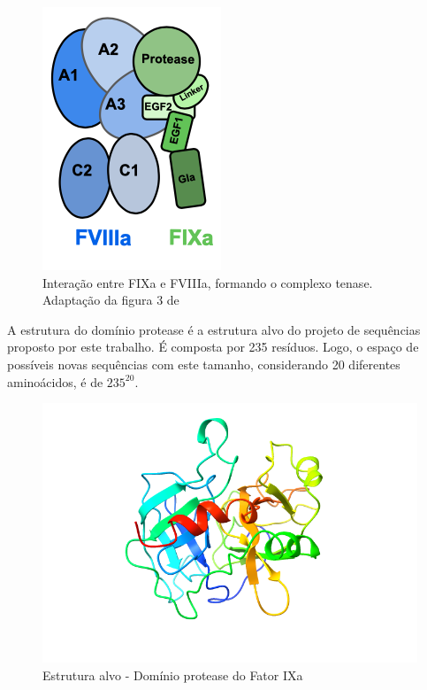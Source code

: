 
\begin{figure}[H]
    \centering
    \includegraphics[width=.3\textwidth]{figuras/FIXa_FVIIIa.png}
    \caption{Interação entre FIXa e FVIIIa, formando o complexo tenase. Adaptação da figura 3 de \cite{FIX}}
  \end{figure}

A estrutura do domínio protease é a estrutura alvo do projeto de sequências proposto por este trabalho.  
É composta por 235 resíduos. 
Logo, o espaço de possíveis novas sequências com este tamanho, considerando 20 diferentes aminoácidos, é de $235^20$. 

\begin{figure}[H]
    \centering
    \includegraphics[width=.6\textwidth]{figuras/FIX.jpg}
    \caption{Estrutura alvo - Domínio protease do Fator IXa}
  \end{figure}

